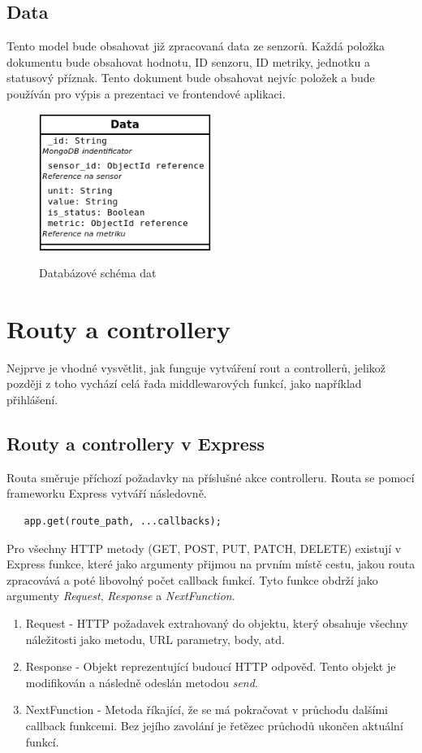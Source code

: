\documentclass[thesis=M,czech]{FITthesis}[2018/10/20]
\begin{document}
\subsection{Data}
Tento model bude obsahovat již zpracovaná data ze senzorů. Každá položka dokumentu bude obsahovat hodnotu, ID senzoru, ID metriky, jednotku a statusový příznak. Tento dokument bude obsahovat nejvíc položek a bude používán pro výpis a prezentaci ve frontendové aplikaci.
\begin{figure}[h]
\caption{Databázové schéma dat}
\centering
\includegraphics[width=0.50\textwidth]{diagrams/data}
\label{fig:data_schema}
\end{figure}

\section{Routy a controllery}
Nejprve je vhodné vysvětlit, jak funguje vytváření rout a controllerů, jelikož později z toho vychází celá řada middlewarových funkcí, jako například přihlášení. 

\subsection{Routy a controllery v Express}
Routa směruje příchozí požadavky na příslušné akce controlleru. Routa se pomocí frameworku Express vytváří následovně.
\begin{lstlisting}
   app.get(route_path, ...callbacks);
\end{lstlisting}
Pro všechny HTTP metody (GET, POST, PUT, PATCH, DELETE) existují v Express funkce, které jako argumenty přijmou na prvním místě cestu, jakou routa zpracovává a poté libovolný počet callback funkcí. Tyto funkce obdrží jako argumenty \textit{Request}, \textit{Response} a \textit{NextFunction}.

\begin{enumerate}
\item Request - HTTP požadavek extrahovaný do objektu, který obsahuje všechny náležitosti jako metodu, URL parametry, body, atd.
\item Response - Objekt reprezentující budoucí HTTP odpověď. Tento objekt je modifikován a následně odeslán metodou \textit{send}.
\item NextFunction - Metoda říkající, že se má pokračovat v průchodu dalšími callback funkcemi. Bez jejího zavolání je řetězec průchodů ukončen aktuální funkcí.
\end{enumerate}
\end{document}
